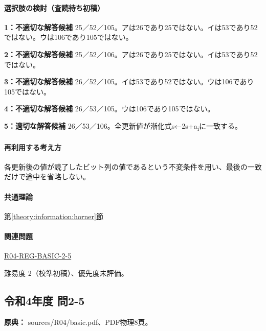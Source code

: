 \paragraph{選択肢の検討（査読待ち初稿）}\mbox{}\par

\noindent\textbf{1：不適切な解答候補} 25／52／105。アは26であり25ではない。イは53であり52ではない。ウは106であり105ではない。\par

\noindent\textbf{2：不適切な解答候補} 25／52／106。アは26であり25ではない。イは53であり52ではない。\par

\noindent\textbf{3：不適切な解答候補} 26／52／105。イは53であり52ではない。ウは106であり105ではない。\par

\noindent\textbf{4：不適切な解答候補} 26／53／105。ウは106であり105ではない。\par

\noindent\textbf{5：適切な解答候補} 26／53／106。全更新値が漸化式s←2s+a\textsubscript{i}に一致する。\par

\paragraph{再利用する考え方} 各更新後の値が読了したビット列の値であるという不変条件を用い、最後の一致だけで途中を省略しない。

\paragraph{共通理論} \hyperref[theory:information:horner]{第\ref*{theory:information:horner}節}

\paragraph{関連問題} \hyperref[q:r04-reg-basic-2-5]{R04-REG-BASIC-2-5}

\par 難易度 2（校準初稿）、優先度未評価。

\subsection{令和4年度 問2-5}
\label{q:r04-reg-basic-2-5}

\noindent\textbf{原典：} sources/R04/basic.pdf、PDF物理8頁。

